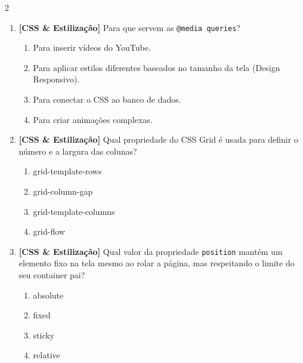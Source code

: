\documentclass[a4paper,10pt]{article}
\begin{document}
\begin{multicols*}{2}
\begin{enumerate}[label=\textbf{\arabic*.}, resume, leftmargin=*]
\item \textbf{[CSS \& Estilização]} Para que servem as \texttt{@media queries}?
\begin{enumerate}[label=(\alph*), noitemsep]
  \item Para inserir vídeos do YouTube.
  \item Para aplicar estilos diferentes baseados no tamanho da tela (Design Responsivo).
  \item Para conectar o CSS ao banco de dados.
  \item Para criar animações complexas.
\end{enumerate}

\item \textbf{[CSS \& Estilização]} Qual propriedade do CSS Grid é usada para definir o número e a largura das colunas?
\begin{enumerate}[label=(\alph*), noitemsep]
  \item grid-template-rows
  \item grid-column-gap
  \item grid-template-columns
  \item grid-flow
\end{enumerate}

\item \textbf{[CSS \& Estilização]} Qual valor da propriedade \texttt{position} mantém um elemento fixo na tela mesmo ao rolar a página, mas respeitando o limite do seu container pai?
\begin{enumerate}[label=(\alph*), noitemsep]
  \item absolute
  \item fixed
  \item sticky
  \item relative
\end{enumerate}

\end{enumerate}
\end{multicols*}
\newpage
\end{document}
